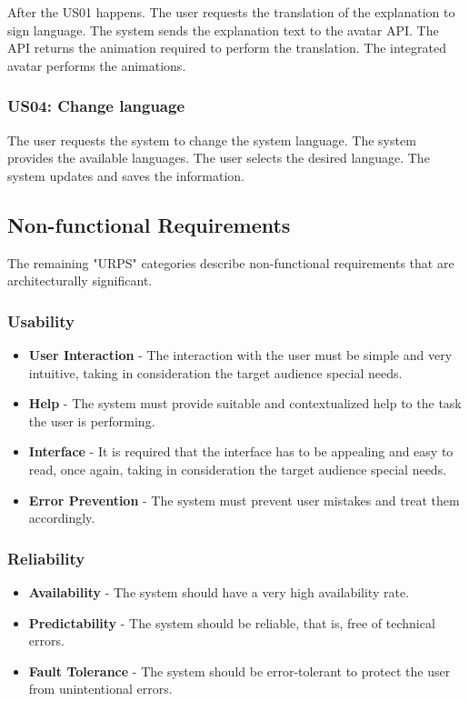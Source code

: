 After the US01 happens.
The user requests the translation of the explanation to sign language.
The system sends the explanation text to the avatar API.
The API returns the animation required to perform the translation.
The integrated avatar performs the animations.

\subsubsection{US04: Change language}

The user requests the system to change the system language.
The system provides the available languages.
The user selects the desired language.
The system updates and saves the information.

\subsection{Non-functional Requirements}

The remaining "URPS" categories describe non-functional requirements that are architecturally significant.

\subsubsection{Usability}

\begin{itemize}
    \item \textbf{User Interaction} - The interaction with the user must be simple and very intuitive, taking in consideration the target audience special needs.
    \item \textbf{Help} - The system must provide suitable and contextualized help to the task the user is performing.
    \item \textbf{Interface} - It is required that the interface has to be appealing and easy to read, once again, taking in consideration the target audience special needs.
    \item \textbf{Error Prevention} - The system must prevent user mistakes and treat them accordingly.
\end{itemize}

\subsubsection{Reliability}

\begin{itemize}
    \item \textbf{Availability} - The system should have a very high availability rate.
    \item \textbf{Predictability} - The system should be reliable, that is, free of technical errors.
    \item \textbf{Fault Tolerance} - The system should be error-tolerant to protect the user from unintentional errors.
\end{itemize}

